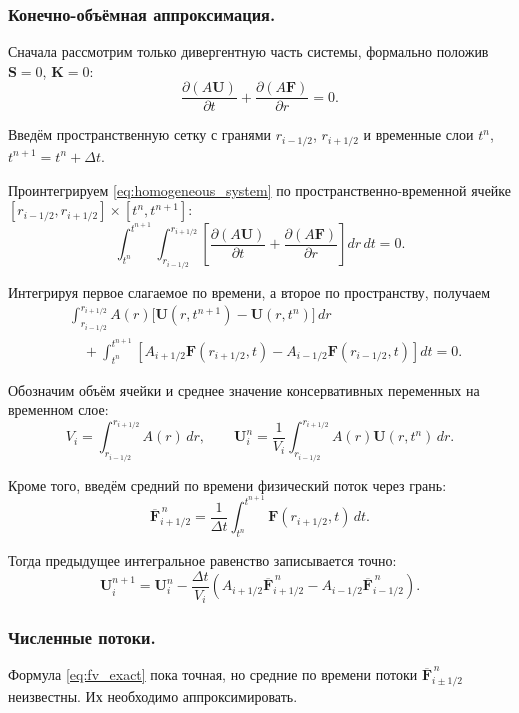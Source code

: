 \documentclass[11pt,a4paper]{article}
\providecommand{\U}{}
\renewcommand{\U}{\bm U}
\newcommand{\F}{\bm F}
\newcommand{\Src}{\bm S}
\begin{document}
\subsubsection{Конечно-объёмная аппроксимация.}

Сначала рассмотрим только дивергентную часть системы,
формально положив $\Src=0$, $\bm K=0$:
\begin{equation}
\frac{\partial(A\U)}{\partial t}
+\frac{\partial(A\F)}{\partial r}=0.
\label{eq:homogeneous_system}
\end{equation}

Введём пространственную сетку с гранями
$r_{i-1/2}$, $r_{i+1/2}$ и временные слои
$t^n$, $t^{n+1}=t^n+\Delta t$.

Проинтегрируем \eqref{eq:homogeneous_system}
по пространственно-временной ячейке
$[r_{i-1/2},r_{i+1/2}]
\times[t^n,t^{n+1}]$:
\[
\int_{t^n}^{t^{n+1}}
\int_{r_{i-1/2}}^{r_{i+1/2}}
\left[
\frac{\partial(A\U)}{\partial t}
+\frac{\partial(A\F)}{\partial r}
\right]dr\,dt=0.
\]

Интегрируя первое слагаемое по времени,
а второе по пространству, получаем
\begin{align*}
&\int_{r_{i-1/2}}^{r_{i+1/2}}
A(r)\bigl[\U(r,t^{n+1})-\U(r,t^n)\bigr]\,dr
\\
&\quad+
\int_{t^n}^{t^{n+1}}
\left[
A_{i+1/2}\F(r_{i+1/2},t)
-A_{i-1/2}\F(r_{i-1/2},t)
\right]dt=0.
\end{align*}

Обозначим объём ячейки и среднее значение
консервативных переменных на временном слое:
\[
V_i=\int_{r_{i-1/2}}^{r_{i+1/2}}A(r)\,dr,
\qquad
\U_i^n=
\frac{1}{V_i}
\int_{r_{i-1/2}}^{r_{i+1/2}}
A(r)\U(r,t^n)\,dr.
\]

Кроме того, введём средний по времени
физический поток через грань:
\[
\overline{\F}_{i+1/2}^{\,n}
=\frac{1}{\Delta t}
\int_{t^n}^{t^{n+1}}
\F(r_{i+1/2},t)\,dt.
\]

Тогда предыдущее интегральное равенство
записывается точно:
\begin{equation}
\boxed{
\U_i^{n+1}
=\U_i^n
-\frac{\Delta t}{V_i}
\left(
A_{i+1/2}\overline{\F}_{i+1/2}^{\,n}
-A_{i-1/2}\overline{\F}_{i-1/2}^{\,n}
\right).
}
\label{eq:fv_exact}
\end{equation}

\subsubsection{Численные потоки.}

Формула \eqref{eq:fv_exact} пока точная,
но средние по времени потоки
$\overline{\F}_{i\pm1/2}^{\,n}$ неизвестны.
Их необходимо аппроксимировать.
\end{document}
